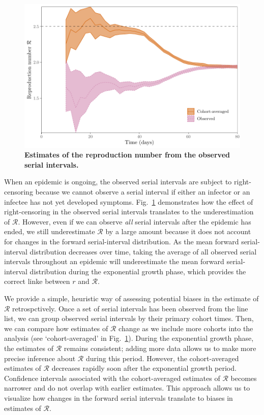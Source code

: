 \documentclass[12pt]{article}
\newcommand{\fref}[1]{Fig.~\ref{fig:#1}}
\begin{document}
\begin{figure}[!ht]
\includegraphics[width=\textwidth]{observedrR.pdf}
\caption{
\textbf{Estimates of the reproduction number from the observed serial intervals.}
}
\label{fig:obsrR}
\end{figure}

When an epidemic is ongoing, the observed serial intervals are subject to right-censoring because we cannot observe a serial interval if either an infector or an infectee has not yet developed symptoms.
\fref{obsrR} demonstrates how the effect of right-censoring in the observed serial intervals translates to the underestimation of $\mathcal R$.
However, even if we can observe \emph{all} serial intervals after the epidemic has ended, we still underestimate $\mathcal R$ by a large amount because it does not account for changes in the forward serial-interval distribution.
As the mean forward serial-interval distribution decreases over time, taking the average of all observed serial intervals throughout an epidemic will underestimate the mean forward serial-interval distribution during the exponential growth phase, which provides the correct linke between $r$ and $\mathcal R$.

We provide a simple, heuristic way of assessing potential biases in the estimate of $\mathcal R$ retrospctively.
Once a set of serial intervals has been observed from the line list, we can group observed serial intervals by their primary cohort times.
Then, we can compare how estimates of $\mathcal R$ change as we include more cohorts into the analysis (see `cohort-averaged' in \fref{obsrR}).
During the exponential growth phase, the estimates of $\mathcal R$ remains consistent;
adding more data allows us to make more precise inference about $\mathcal R$ during this period.
However, the cohort-averaged estimates of $\mathcal R$ decreases rapidly soon after the exponential growth period.
Confidence intervals associated with the cohort-averaged estimates of $\mathcal R$ becomes narrower and do not overlap with earlier estimates.
This approach allows us to visualize how changes in the forward serial intervals translate to biases in estimates of $\mathcal R$.
\end{document}
